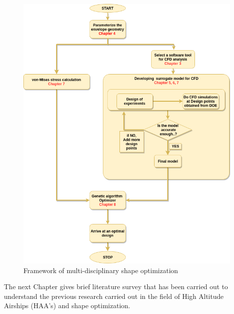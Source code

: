 \begin{figure}[H]
	\includegraphics[width=\textwidth]{layout/report_layout.png} 
	\caption{Framework of multi-disciplinary shape optimization}
	\label{Report layout} %
\end{figure}
The next Chapter gives brief literature survey that has been carried out to understand the previous research carried out in the field of High Altitude Airships (HAA's) and shape optimization.





